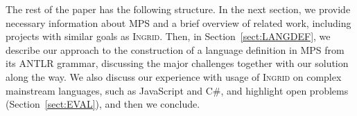 The rest of the paper has the following structure.
In the next section, we provide necessary information about MPS and a brief overview of related work, including projects with similar goals as \textsc{Ingrid}.
Then, in Section~\ref{sect:LANGDEF}, we describe our approach to the construction of a language definition in MPS from its ANTLR grammar, discussing the major challenges together with our solution along the way.
We also discuss our experience with usage of \textsc{Ingrid} on complex mainstream languages, such as JavaScript and C\#, and highlight open problems (Section~\ref{sect:EVAL}), and then we conclude.

